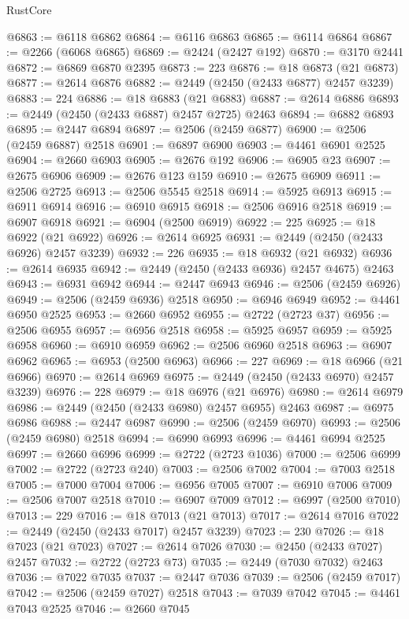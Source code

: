 \begin{lexlean}{RustCore}
\begin{coremodule}
@6863 := @6118 @6862
@6864 := @6116 @6863
@6865 := @6114 @6864
@6867 := @2266 (@6068 @6865)
@6869 := @2424 (@2427 @192)
@6870 := @3170 @2441
@6872 := @6869 @6870 @2395
@6873 := 223
@6876 := @18 @6873 (@21 @6873)
@6877 := @2614 @6876
@6882 := @2449 (@2450 (@2433 @6877) @2457 @3239)
@6883 := 224
@6886 := @18 @6883 (@21 @6883)
@6887 := @2614 @6886
@6893 := @2449 (@2450 (@2433 @6887) @2457 @2725) @2463
@6894 := @6882 @6893
@6895 := @2447 @6894
@6897 := @2506 (@2459 @6877)
@6900 := @2506 (@2459 @6887) @2518
@6901 := @6897 @6900
@6903 := @4461 @6901 @2525
@6904 := @2660 @6903
@6905 := @2676 @192
@6906 := @6905 @23
@6907 := @2675 @6906
@6909 := @2676 @123 @159
@6910 := @2675 @6909
@6911 := @2506 @2725
@6913 := @2506 @5545 @2518
@6914 := @5925 @6913
@6915 := @6911 @6914
@6916 := @6910 @6915
@6918 := @2506 @6916 @2518
@6919 := @6907 @6918
@6921 := @6904 (@2500 @6919)
@6922 := 225
@6925 := @18 @6922 (@21 @6922)
@6926 := @2614 @6925
@6931 := @2449 (@2450 (@2433 @6926) @2457 @3239)
@6932 := 226
@6935 := @18 @6932 (@21 @6932)
@6936 := @2614 @6935
@6942 := @2449 (@2450 (@2433 @6936) @2457 @4675) @2463
@6943 := @6931 @6942
@6944 := @2447 @6943
@6946 := @2506 (@2459 @6926)
@6949 := @2506 (@2459 @6936) @2518
@6950 := @6946 @6949
@6952 := @4461 @6950 @2525
@6953 := @2660 @6952
@6955 := @2722 (@2723 @37)
@6956 := @2506 @6955
@6957 := @6956 @2518
@6958 := @5925 @6957
@6959 := @5925 @6958
@6960 := @6910 @6959
@6962 := @2506 @6960 @2518
@6963 := @6907 @6962
@6965 := @6953 (@2500 @6963)
@6966 := 227
@6969 := @18 @6966 (@21 @6966)
@6970 := @2614 @6969
@6975 := @2449 (@2450 (@2433 @6970) @2457 @3239)
@6976 := 228
@6979 := @18 @6976 (@21 @6976)
@6980 := @2614 @6979
@6986 := @2449 (@2450 (@2433 @6980) @2457 @6955) @2463
@6987 := @6975 @6986
@6988 := @2447 @6987
@6990 := @2506 (@2459 @6970)
@6993 := @2506 (@2459 @6980) @2518
@6994 := @6990 @6993
@6996 := @4461 @6994 @2525
@6997 := @2660 @6996
@6999 := @2722 (@2723 @1036)
@7000 := @2506 @6999
@7002 := @2722 (@2723 @240)
@7003 := @2506 @7002
@7004 := @7003 @2518
@7005 := @7000 @7004
@7006 := @6956 @7005
@7007 := @6910 @7006
@7009 := @2506 @7007 @2518
@7010 := @6907 @7009
@7012 := @6997 (@2500 @7010)
@7013 := 229
@7016 := @18 @7013 (@21 @7013)
@7017 := @2614 @7016
@7022 := @2449 (@2450 (@2433 @7017) @2457 @3239)
@7023 := 230
@7026 := @18 @7023 (@21 @7023)
@7027 := @2614 @7026
@7030 := @2450 (@2433 @7027) @2457
@7032 := @2722 (@2723 @73)
@7035 := @2449 (@7030 @7032) @2463
@7036 := @7022 @7035
@7037 := @2447 @7036
@7039 := @2506 (@2459 @7017)
@7042 := @2506 (@2459 @7027) @2518
@7043 := @7039 @7042
@7045 := @4461 @7043 @2525
@7046 := @2660 @7045

\end{coremodule}
\end{lexlean}
